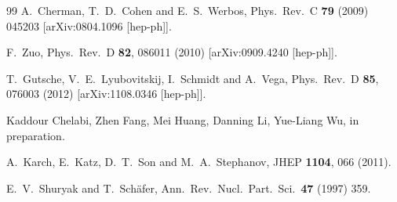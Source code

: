 \documentclass[aps,prd,showpacs,preprintnumbers,twocolumn]{revtex4}
\begin{document}
\begin{thebibliography}{99}
  A.~Cherman, T.~D.~Cohen and E.~S.~Werbos,
  Phys.\ Rev.\ C {\bf 79} (2009) 045203  [arXiv:0804.1096 [hep-ph]].  %

  F.~Zuo,
  Phys.\ Rev.\ D {\bf 82}, 086011 (2010)
  [arXiv:0909.4240 [hep-ph]].

  T.~Gutsche, V.~E.~Lyubovitskij, I.~Schmidt and A.~Vega,
  Phys.\ Rev.\ D {\bf 85}, 076003 (2012)
  [arXiv:1108.0346 [hep-ph]].

 Kaddour Chelabi, Zhen Fang, Mei Huang, Danning Li, Yue-Liang Wu, in preparation.


 A.~Karch, E.~Katz, D.~T.~Son and M.~A.~Stephanov,
  JHEP {\bf 1104}, 066 (2011).




   E.~V.~Shuryak and T.~Schäfer,
  Ann.\ Rev.\ Nucl.\ Part.\ Sci.\  {\bf 47} (1997) 359.




\end{thebibliography}
\end{document}
